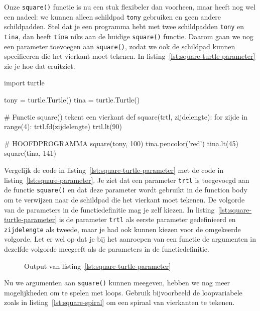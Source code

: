 \documentclass[../main]{subfiles}
\begin{document}
Onze \texttt{square()} functie is nu een stuk flexibeler dan voorheen, maar heeft nog wel een nadeel: we kunnen alleen schildpad \texttt{tony} gebruiken en geen andere schildpadden. Stel dat je een programma hebt met twee schildpadden \texttt{tony} en \texttt{tina}, dan heeft \texttt{tina} niks aan de huidige \texttt{square()} functie. Daarom gaan we nog een parameter toevoegen aan \texttt{square()}, zodat we ook de schildpad kunnen specificeren die het vierkant moet tekenen. In listing~\ref{lst:square-turtle-parameter} zie je hoe dat eruitziet.

\begin{python}[style=mu, caption={Functie \texttt{square()} met parameters \texttt{trtl} en \texttt{zijdelengte}}, label={lst:square-turtle-parameter}]
import turtle

tony = turtle.Turtle()
tina = turtle.Turtle()

# Functie square() tekent een vierkant
def square(trtl, zijdelengte):
    for zijde in range(4):
        trtl.fd(zijdelengte)
        trtl.lt(90)

# HOOFDPROGRAMMA
square(tony, 100)
tina.pencolor('red')
tina.lt(45)
square(tina, 141)
\end{python}

Vergelijk de code in listing~\ref{lst:square-turtle-parameter} met de code in listing~\ref{lst:square-parameter}. Je ziet dat een parameter \texttt{trtl} is toegevoegd aan de functie \texttt{square()} en dat deze parameter wordt gebruikt in de function body om te verwijzen naar de schildpad die het vierkant moet tekenen. De volgorde van de parameters in de functiedefinitie mag je zelf kiezen. In listing~\ref{lst:square-turtle-parameter} is de parameter \texttt{trtl} als eerste parameter gedefinieerd en \texttt{zijdelengte} als tweede, maar je had ook kunnen kiezen voor de omgekeerde volgorde. Let er wel op dat je bij het aanroepen van een functie de argumenten in dezelfde volgorde meegeeft als de parameters in de functiedefinitie.

\begin{figure}[ht]
    \centering
    \caption{Output van listing~\ref{lst:square-turtle-parameter}}%
    \label{fig:turtle-tony-and-tina}
\end{figure}

Nu we argumenten aan \texttt{square()} kunnen meegeven, hebben we nog meer mogelijkheden om te spelen met loops. Gebruik bijvoorbeeld de loopvariabele zoals in listing~\ref{lst:square-spiral} om een spiraal van vierkanten te tekenen.
\end{document}
